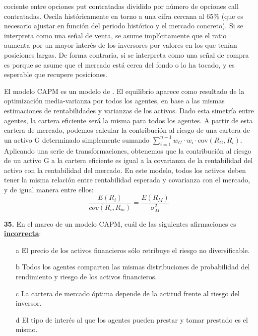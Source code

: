 \documentclass{nuevotema}
\begin{document}
 cociente entre opciones put contratadas dividido por número de opciones call contratadas. Oscila históricamente en torno a una cifra cercana al 65\% (que es necesario ajustar en función del periodo histórico y el mercado concreto). Si se interpreta como una señal de venta, se asume implícitamente que el ratio aumenta por un mayor interés de los inversores por  valores en los que tenían posiciones largas. De forma contraria, si se interpreta como una señal de compra es porque se asume que el mercado está cerca del fondo o lo ha tocado, y es esperable que recupere posiciones.

El modelo CAPM es un modelo de . El equilibrio aparece como resultado de la optimización media-varianza por todos los agentes, en base a las mismas estimaciones de rentabilidades y varianzas de los activos. Dado esta simetría entre agentes, la cartera eficiente será la misma para todos los agentes. A partir de esta cartera de mercado, podemos calcular la contribución al riesgo de una cartera de un activo G determinado simplemente sumando $\sum_{i=1}^{n-1} w_G\cdot w_i \cdot \text{cov}(R_G, R_i)$. Aplicando una serie de transformaciones, obtenemos que la contribución al riesgo de un activo G a la cartera eficiente es igual a la covarianza de la rentabilidad del activo con la rentabilidad del mercado. En este modelo, todos los activos deben tener la misma relación entre rentabilidad esperada y covarianza con el mercado, y de igual manera entre ellos:
\begin{equation}
    \frac{E(R_i)}{cov(R_i, R_m)} = \frac{E(R_M)}{\sigma_M^2} 
\end{equation}



\preguntas


\textbf{35.} En el marco de un modelo CAPM, cuál de las siguientes afirmaciones es \textbf{\underline{incorrecta}}:

\begin{itemize}
	\item[a] El precio de los activos financieros sólo retribuye el riesgo no diversificable.
	\item[b] Todos los agentes comparten las mismas distribuciones de probabilidad del rendimiento y riesgo de los activos financieros.
	\item[c] La cartera de mercado óptima depende de la actitud frente al riesgo del inversor.
	\item[d] El tipo de interés al que los agentes pueden prestar y tomar prestado es el mismo.
\end{itemize}
\end{document}
